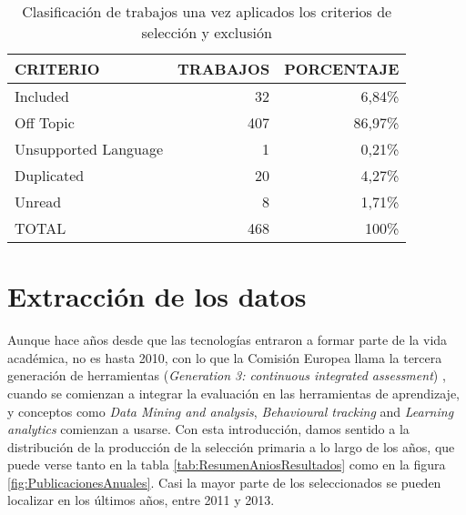 \begin{table}[H]
  \begin{center}
  \begin{tabular}{| m{4cm} | r | r |}
    \hline
    CRITERIO & TRABAJOS & PORCENTAJE\\
    \hline
    \hline 
    Included & 32 & 6,84\% \\
    \hline
    Off Topic & 407 & 86,97\% \\
    \hline
    Unsupported Language & 1 & 0,21\% \\
    \hline
    Duplicated & 20 & 4,27\% \\
    \hline
    Unread & 8 & 1,71\% \\
    \hline
    TOTAL & 468 & 100\% \\
    \hline
  \end{tabular}
\end{center}
\caption{Clasificación de trabajos una vez aplicados los criterios de selección y exclusión}
\label{tab:ResumenSelecccionResultados}
\end{table} 


\section{Extracción de los datos}

Aunque hace años desde que las tecnologías entraron a formar parte de la vida académica, no es hasta 2010, con lo que la Comisión Europea llama la tercera generación de herramientas (\emph{Generation 3: continuous integrated assessment}) \cite{Redecker:2013}, cuando se comienzan a integrar la evaluación en las herramientas de aprendizaje, y conceptos como \emph{Data Mining and analysis}, \emph{Behavioural tracking} and \emph{Learning analytics} comienzan a usarse. Con esta introducción, damos sentido a la distribución de la producción de la selección primaria a lo largo de los años, que puede verse tanto en la tabla \ref{tab:ResumenAniosResultados} como en la figura \ref{fig:PublicacionesAnuales}. Casi la mayor parte de los seleccionados se pueden localizar en los últimos años, entre 2011 y 2013.


